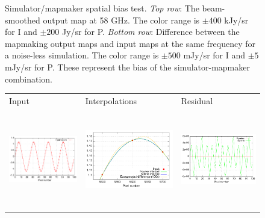 \documentclass{article}
\begin{document}
\begin{figure}
\begin{tabular}{rm{56mm}m{54.4mm}m{56mm}}
	\end{tabular}
	\caption{Simulator/mapmaker spatial bias test.
		\emph{Top row}: The beam-smoothed output map at 58 GHz.
			The color range is $\pm 400$ kJy/sr for I and $\pm 200$ Jy/sr for P.
		\emph{Bottom row}: Difference between the mapmaking output maps and
			input maps at the same frequency for a noise-less simulation.
			The color range is $\pm 500$ mJy/sr for I and $\pm 5$ mJy/sr for P.
			These represent the bias of the simulator-mapmaker combination.}
\end{figure}

\begin{figure}
	\centering
	\hspace*{-13mm}\begin{tabular}{m{59mm}m{59mm}m{59mm}}
		\hspace{30mm}Input & \hspace{20mm}Interpolations & \hspace{30mm}Residual \\
		\includegraphics[height=43mm,clip,trim=0 0 0 0]{plots/subpixel_model_input.pdf} &
		\includegraphics[height=43mm,clip,trim=0 0 0 0]{plots/subpixel_model_interpol.pdf} &
		\includegraphics[height=43mm,clip,trim=0 0 0 0]{plots/subpixel_model_residual.pdf}

\end{tabular}
\end{figure}
\end{document}
